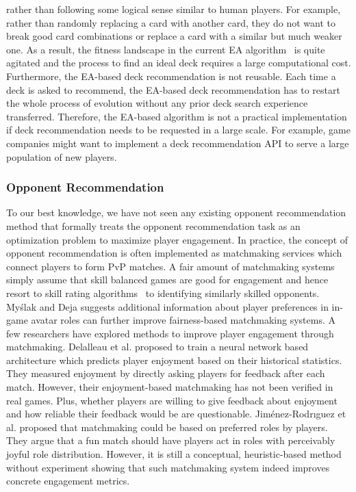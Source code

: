 rather than following some logical sense similar to human players. For example, rather than randomly replacing a card with another card, they do not want to break good card combinations or replace a card with a similar but much weaker one. As a result, the fitness landscape in the current EA algorithm~\cite{garcia2016evolutionary} is quite agitated and the process to find an ideal deck requires a large computational cost. Furthermore, the EA-based deck recommendation is not reusable. Each time a deck is asked to recommend, the EA-based deck recommendation has to restart the whole process of evolution without any prior deck search experience transferred. Therefore, the EA-based algorithm is not a practical implementation if deck recommendation needs to be requested in a large scale. For example, game companies might want to implement a deck recommendation API to serve a large population of new players.



\subsubsection{Opponent Recommendation}
To our best knowledge, we have not seen any existing opponent recommendation method that formally treats the opponent recommendation task as an optimization problem to maximize player engagement.
 In practice, the concept of opponent recommendation is often implemented as matchmaking services which connect players to form PvP matches. A fair amount of matchmaking systems simply assume that skill balanced games are good for engagement \cite{graepel2006ranking,sweetser2005gameflow,flow1990psychology,chen2007flow} and hence resort to skill rating algorithms~\cite{glickman1999parameter,elo1978rating,herbrich:trueskill} to identifying similarly skilled opponents. My\'{s}lak and Deja \cite{myslak2014developing} suggests additional information about player preferences in in-game avatar roles can further improve fairness-based matchmaking systems. A few researchers have explored methods to improve player engagement through matchmaking. Delalleau et al. \cite{Delalleau2012} proposed to train a neural network based architecture which predicts player enjoyment based on their historical statistics. They measured enjoyment by directly asking players for feedback after each match. However, their enjoyment-based matchmaking has not been verified in real games. Plus, whether players are willing to give feedback about enjoyment and how reliable their feedback would be are questionable. Jim{\'e}nez-Rodr{\i}guez et al. \cite{jimenez2011matchmaking} proposed that matchmaking could be based on preferred roles by players. They argue that a fun match should have players act in  roles with perceivably joyful role distribution. However, it is still a conceptual, heuristic-based method without experiment showing that such matchmaking system indeed improves concrete engagement metrics. 



